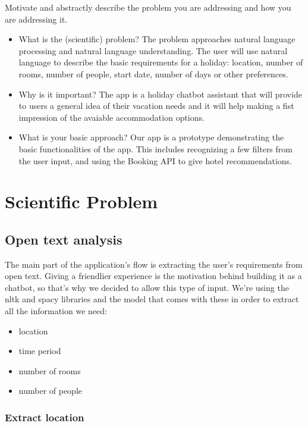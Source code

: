 \documentclass[runningheads,a4paper,11pt]{report}
\begin{document}
Motivate and abstractly describe the problem you are addressing and how you are addressing it. 
\begin{itemize}
	\item What is the (scientific) problem? 
	\newline
	The problem approaches natural language processing and natural language understanding. The user will use natural language to describe the basic requirements for a holiday: location, number of rooms, number of people, start date, number of days or other preferences.
	\item Why is it important? 
	\newline
	The app is a holiday chatbot assistant that will provide to users a general idea of their vacation needs and it will help making a fist impression of the avaiable accommodation options.

	\item What is your basic approach? 
	\newline
	Our app is a prototype demonstrating the basic functionalities of the app. This includes recognizing a few filters from the user input, and using the Booking API to give hotel recommendations.

\end{itemize}



\chapter{Scientific Problem}
\label{section:scientificProblem}

\section{Open text analysis}
\label{section:openTextAnalysis}
The main part of the application's flow is extracting the user's requirements from open text. Giving a friendlier experience is the motivation behind building it as a chatbot, so that's why we decided to allow this type of input. We're using the nltk and spacy libraries and the model that comes with these in order to extract all the information we need:
\begin{itemize}
	\item location
	\item time period
	\item number of rooms
	\item number of people
\end{itemize}  
\subsection{Extract location}
\end{document}
